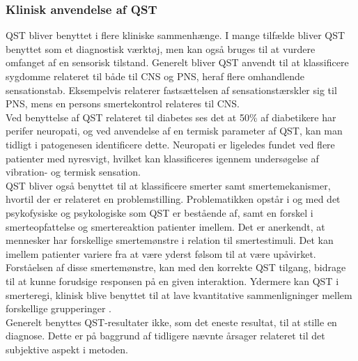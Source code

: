 \subsubsection{Klinisk anvendelse af QST}
QST bliver benyttet i flere kliniske sammenhænge. I mange tilfælde bliver QST benyttet som et diagnostisk værktøj, men kan også bruges til at vurdere omfanget af en sensorisk tilstand. Generelt bliver QST anvendt til at klassificere sygdomme relateret til både til CNS og PNS, heraf flere omhandlende sensationstab. Eksempelvis relaterer fastsættelsen af sensationstærskler sig til PNS, mens en persons smertekontrol relateres til CNS. \\ 
Ved benyttelse af QST relateret til diabetes ses det at 50\% af diabetikere har perifer neuropati, og ved anvendelse af en termisk parameter af QST, kan man tidligt i patogenesen identificere dette. Neuropati er ligeledes fundet ved flere patienter med nyresvigt, hvilket kan klassificeres igennem undersøgelse af vibration- og termisk sensation. \citep{Yarnitsky1997} \citep{Yarnitsky2006} \\
QST bliver også benyttet til at klassificere smerter samt smertemekanismer, hvortil der er relateret en problemstilling. Problematikken opstår i og med det psykofysiske og psykologiske som QST er bestående af, samt en forskel i smerteopfattelse og smertereaktion patienter imellem. \citep{Yarnitsky1997} Det er anerkendt, at mennesker har forskellige smertemønstre i relation til smertestimuli. Det kan imellem patienter variere fra at være yderst følsom til at være upåvirket. Forståelsen af disse smertemønstre, kan med den korrekte QST tilgang, bidrage til at kunne forudsige responsen på en given interaktion. \citep{Yarnitsky2006} Ydermere kan QST i smerteregi, klinisk blive benyttet til at lave kvantitative sammenligninger mellem forskellige grupperinger \citep{Arendt-Nielsen2009}. \\
Generelt benyttes QST-resultater ikke, som det eneste resultat, til at stille en diagnose. Dette er på baggrund af tidligere nævnte årsager relateret til det subjektive aspekt i metoden. \citep{Yarnitsky2006}


